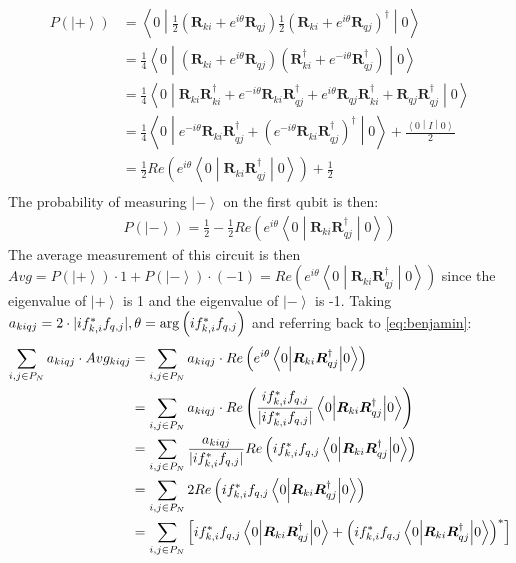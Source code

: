 \documentclass{aux/ttuthes2007}
\newcommand{\ket}[1]{\ensuremath{\left|#1\right\rangle}}
\newcommand{\sandwich}[3]{\left< #1 \middle\vert #2 \middle\vert #3 \right>}
\newcommand{\paren}[1]{\left( #1 \right)}
\newcommand{\elec}{N}
\DeclarePairedDelimiter\abs{\lvert}{\rvert}
\begin{document}
\begin{equation*}
	\begin{split}
		P(\ket +)
		&= \sandwich 0 {
			\frac{1}{2}\paren{\bm R_{ki} + e^{i\theta} \bm R_{qj}}
			\frac{1}{2}\paren{\bm R_{ki} + e^{i\theta} \bm R_{qj}}^{\dagger}
		} 0 \\
		&= \frac 1 4 \sandwich 0 {
			\paren{\bm R_{ki} + e^{i\theta} \bm R_{qj}}
			\paren{\bm R_{ki}^\dagger + e^{-i\theta} \bm R_{qj}^{\dagger}}
		} 0 \\
		&= \frac 1 4 \sandwich 0 {
			\bm R_{ki}\bm R_{ki}^\dagger + e^{-i\theta} \bm R_{ki}\bm R_{qj}^{\dagger} 
			+ e^{i\theta} \bm R_{qj}\bm R_{ki}^\dagger + \bm R_{qj}\bm R_{qj}^\dagger
		} 0 \\
		&= \frac 1 4 \sandwich 0 {
			e^{-i\theta} \bm R_{ki}\bm R_{qj}^{\dagger} + \paren{e^{-i\theta} \bm R_{ki}\bm R_{qj}^\dagger}^\dagger
		} 0 
			+ \frac{\sandwich 0 I 0}{2}\\
		&= \frac 1 2 Re\paren{e^{i\theta}\sandwich 0 {
			 \bm R_{ki}\bm R_{qj}^{\dagger}
	} 0 }
			+ \frac{1}{2}\\
	\end{split}
\end{equation*}
The probability of measuring $\ket -$ on the first qubit is then:
\begin{equation*}
	\begin{split}
		P(\ket -)
		= \frac 1 2 - \frac 1 2 Re\paren{e^{i\theta}\sandwich 0 {
			 \bm R_{ki}\bm R_{qj}^{\dagger}
	} 0 }
	\end{split}
\end{equation*}
The average measurement of this circuit is then $Avg = P(\ket +) \cdot 1 + P(\ket -) \cdot (-1) = Re\paren{e^{i\theta}\sandwich 0 {\bm R_{ki}\bm R_{qj}^{\dagger}} 0}$ since the eigenvalue of $\ket +$ is 1 and the eigenvalue of $\ket -$ is -1.
%
Taking $a_{kiqj} = 2\cdot \abs{if_{k, i}^*f_{q, j}}, \theta = \arg \paren{if_{k, i}^*f_{q, j}}$ and referring back to \ref{eq:benjamin}:
\begin{equation*}
	\begin{split}
		\sum_{i, j \in P_\elec} a_{kiqj} \cdot Avg_{kiqj} 
		&= \sum_{i, j \in P_\elec} a_{kiqj}\cdot Re\paren{e^{i\theta}\sandwich 0 {\bm R_{ki}\bm R_{qj}^{\dagger}} 0}\\
		&= \sum_{i, j \in P_\elec} a_{kiqj}\cdot Re\paren{\frac{if_{k, i}^*f_{q, j}}{\abs{if_{k, i}^*f_{q, j}}}\sandwich 0 {\bm R_{ki}\bm R_{qj}^{\dagger}} 0}\\
		&= \sum_{i, j \in P_\elec} \frac{a_{kiqj}}{\abs{if_{k, i}^*f_{q, j}}} Re\paren{if_{k, i}^*f_{q, j}\sandwich 0 {\bm R_{ki}\bm R_{qj}^{\dagger}} 0}\\
		&= \sum_{i, j \in P_\elec} 2 Re\paren{if_{k, i}^*f_{q, j}\sandwich 0 {\bm R_{ki}\bm R_{qj}^{\dagger}} 0}\\
		&= \sum_{i, j \in P_\elec} 
		\left [if_{k, i}^*f_{q, j}\sandwich 0 {\bm R_{ki}\bm R_{qj}^{\dagger}} 0 +
		\paren{if_{k, i}^*f_{q, j}\sandwich 0 {\bm R_{ki}\bm R_{qj}^{\dagger}} 0}^* \right ]\\
	\end{split}
\end{equation*}
\end{document}
